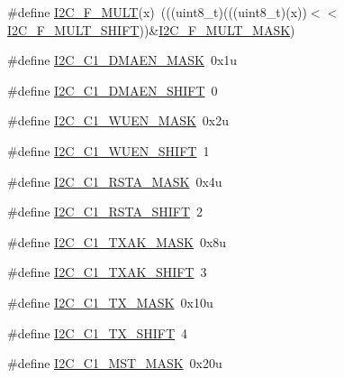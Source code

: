 \begin{DoxyCompactItemize}
\item 
\#define \hyperlink{group___i2_c___register___masks_ga8f7d596736ebbdc72c823abdc045adfd}{I2\+C\+\_\+\+F\+\_\+\+M\+U\+LT}(x)~(((uint8\+\_\+t)(((uint8\+\_\+t)(x))$<$$<$\hyperlink{group___i2_c___register___masks_ga3a338cb3af4c140fde82427d091d5b4a}{I2\+C\+\_\+\+F\+\_\+\+M\+U\+L\+T\+\_\+\+S\+H\+I\+FT}))\&\hyperlink{group___i2_c___register___masks_ga9e077caa9ac07c03f5e34e431d0806fa}{I2\+C\+\_\+\+F\+\_\+\+M\+U\+L\+T\+\_\+\+M\+A\+SK})
\item 
\#define \hyperlink{group___i2_c___register___masks_gadfd8fccdd35a4944a1e53ffa26e5d06b}{I2\+C\+\_\+\+C1\+\_\+\+D\+M\+A\+E\+N\+\_\+\+M\+A\+SK}~0x1u
\item 
\#define \hyperlink{group___i2_c___register___masks_ga1cd5f87cc18a56d293697f0463e2a9e3}{I2\+C\+\_\+\+C1\+\_\+\+D\+M\+A\+E\+N\+\_\+\+S\+H\+I\+FT}~0
\item 
\#define \hyperlink{group___i2_c___register___masks_ga708d3eded28946d6f2e4b7ed5aff8fe8}{I2\+C\+\_\+\+C1\+\_\+\+W\+U\+E\+N\+\_\+\+M\+A\+SK}~0x2u
\item 
\#define \hyperlink{group___i2_c___register___masks_gad1bec740751b47fd0f4e02d913c3b287}{I2\+C\+\_\+\+C1\+\_\+\+W\+U\+E\+N\+\_\+\+S\+H\+I\+FT}~1
\item 
\#define \hyperlink{group___i2_c___register___masks_ga656f6747e8edc8299767365ea1ac9d70}{I2\+C\+\_\+\+C1\+\_\+\+R\+S\+T\+A\+\_\+\+M\+A\+SK}~0x4u
\item 
\#define \hyperlink{group___i2_c___register___masks_gac6c61e0bd2615da3bbc3079984192dd7}{I2\+C\+\_\+\+C1\+\_\+\+R\+S\+T\+A\+\_\+\+S\+H\+I\+FT}~2
\item 
\#define \hyperlink{group___i2_c___register___masks_gaebf88a6e1a433272e606980474b4e577}{I2\+C\+\_\+\+C1\+\_\+\+T\+X\+A\+K\+\_\+\+M\+A\+SK}~0x8u
\item 
\#define \hyperlink{group___i2_c___register___masks_ga95ea65244938ce40ca695f5193268357}{I2\+C\+\_\+\+C1\+\_\+\+T\+X\+A\+K\+\_\+\+S\+H\+I\+FT}~3
\item 
\#define \hyperlink{group___i2_c___register___masks_gaf2c2222f863ed79996904cac957fbcf2}{I2\+C\+\_\+\+C1\+\_\+\+T\+X\+\_\+\+M\+A\+SK}~0x10u
\item 
\#define \hyperlink{group___i2_c___register___masks_ga4785c943be6e7664aad1f3166c54c07c}{I2\+C\+\_\+\+C1\+\_\+\+T\+X\+\_\+\+S\+H\+I\+FT}~4
\item 
\#define \hyperlink{group___i2_c___register___masks_ga4c4f11999967dae4bcf93fcefda51ebe}{I2\+C\+\_\+\+C1\+\_\+\+M\+S\+T\+\_\+\+M\+A\+SK}~0x20u
\item 
$$
\end{DoxyCompactItemize}
